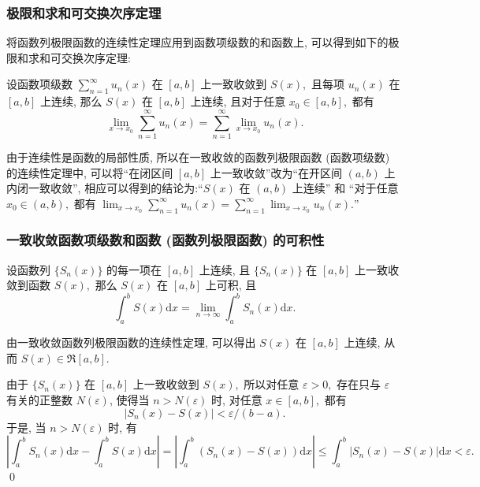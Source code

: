 
\begin{frame}
\frametitle{极限和求和可交换次序定理}

将函数列极限函数的连续性定理应用到函数项级数的和函数上, 可以得到如下的极限和求和可交换次序定理:

\begin{thm}[极限和求和可交换次序定理]
设函数项级数 $\displaystyle \sum_{n=1}^\infty u_n(x)$ 在 $[a, b]$ 上一致收敛到 $S(x),$ 且每项 $u_n(x)$ 在 $[a, b]$ 上连续, 那么 $S(x)$ 在 $[a, b]$ 上连续, 且对于任意 $x_0 \in [a, b],$ 都有
\[
\lim_{x \to x_0} \sum_{n=1}^\infty u_n(x) = \sum_{n=1}^\infty \lim_{x \to x_0} u_n(x).
\]
\end{thm}

\pause
\vspace{0.5em}

\begin{remark}
由于连续性是函数的\alert{局部性质}, 所以在一致收敛的函数列极限函数 (函数项级数) 的连续性定理中, 可以将``在闭区间 $[a, b]$ 上一致收敛''改为``\alert{在开区间 $(a, b)$ 上内闭一致收敛}'', 相应可以得到的结论为:``$S(x)$ 在 $(a, b)$ 上连续'' 和 ``对于任意 $x_0 \in (a, b),$ 都有 $\displaystyle \lim_{x \to x_0} \sum_{n=1}^\infty u_n(x) = \sum_{n=1}^\infty \lim_{x \to x_0} u_n(x).$''
\end{remark}

\end{frame}


\begin{frame}
\frametitle{一致收敛函数项级数和函数 (函数列极限函数) 的可积性}

\begin{thm}[一致收敛函数列极限函数的可积性定理]
设函数列 $\{S_n(x)\}$ 的每一项在 $[a, b]$ 上连续, 且 $\{S_n(x)\}$ 在 $[a, b]$ 上一致收敛到函数 $S(x),$ 那么 $S(x)$ 在 $[a, b]$ 上可积, 且
\[
\int_a^b S(x) \mathrm{d}x = \lim_{n\to\infty} \int_a^b S_n(x) \mathrm{d}x.
\]
\end{thm}

\pause

\startproof[bg=yellow, fg=red]
由一致收敛函数列极限函数的连续性定理, 可以得出 $S(x)$ 在 $[a, b]$ 上连续, 从而 $S(x) \in \mathfrak{R}[a, b].$

\pause
\vspace{0.5em}

由于 $\{S_n(x)\}$ 在 $[a, b]$ 上一致收敛到 $S(x),$ 所以对任意 $\varepsilon > 0,$ 存在只与 $\varepsilon$ 有关的正整数 $N(\varepsilon)$, 使得当 $n > N(\varepsilon)$ 时, 对任意 $x \in [a, b],$ 都有
\[
|S_n(x) - S(x)| < \varepsilon / (b - a).
\]
于是, 当 $n > N(\varepsilon)$ 时, 有
\[
\left| \int_a^b S_n(x) \mathrm{d}x - \int_a^b S(x) \mathrm{d}x \right| = \left| \int_a^b (S_n(x) - S(x)) \mathrm{d}x \right| \leqslant \int_a^b |S_n(x) - S(x)| \mathrm{d}x < \varepsilon.
\]
\qed

\end{frame}

